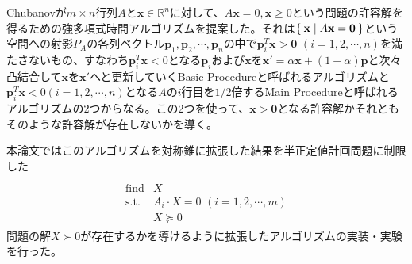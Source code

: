 Chubanovが$m \times n$行列$A$と$\mathbf{x} \in \mathbb{R}^n$に対して、$A \mathbf{x} = 0, \mathbf{x} \geq 0$という問題の許容解を得るための強多項式時間アルゴリズムを提案した。それは$\Set{\mathbf{x} | A \mathbf{x} = \mathbf{0}}$という空間への射影$P_A$の各列ベクトル$\mathbf{p}_1, \mathbf{p}_2, \cdots, \mathbf{p}_n$の中で$\mathbf{p}_i^T \mathbf{x} > \mathbf{0} \,\, (i = 1, 2, \cdots, n)$を満たさないもの、すなわち$\mathbf{p}_i^T \mathbf{x} < 0$となる$\mathbf{p}_i$および$\mathbf{x}$を$\mathbf{x}' = \alpha \mathbf{x} + (1 - \alpha) \mathbf{p}$と次々凸結合して$\mathbf{x}$を$\mathbf{x}'$へと更新していくBasic Procedureと呼ばれるアルゴリズムと$\mathbf{p}_i^T \mathbf{x} < 0 (i = 1, 2, \cdots, n)$となる$A$の$i$行目を$1 / 2$倍するMain Procedureと呼ばれるアルゴリズムの2つからなる。この2つを使って、$\mathbf{x} > \mathbf{0}$となる許容解かそれともそのような許容解が存在しないかを導く。

本論文ではこのアルゴリズムを対称錐に拡張した結果を半正定値計画問題に制限した
\begin{align*}
  \begin{array}{ll} \\
    \text{find} & X \\
    \text{s.t.} & A_i \cdot X = 0 \,\, (i = 1, 2, \cdots, m) \\
                & X \succeq 0
  \end{array}
\end{align*}
問題の解$X \succ 0$が存在するかを導けるように拡張したアルゴリズムの実装・実験を行った。


